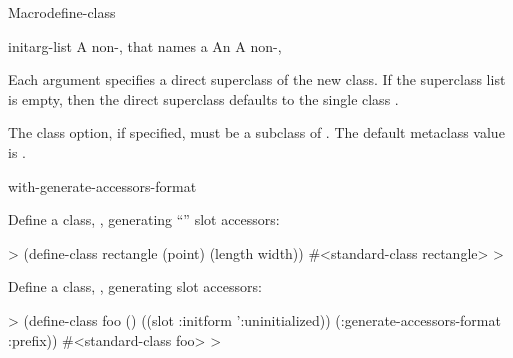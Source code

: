 \documentclass[10pt,twoside,english,pdftex]{article}
\begin{document}
\begin{functiondoc}{Macro}{define-class}
\fnterms
\begin{args}{initarg-list}
 A non-\nil,  that names a
 An 
 A non-\nil, 
\end{args}

\fndescription 
Each  argument specifies a direct superclass of
the new class. If the superclass list is empty, then the direct
superclass defaults to the single class .

%
The  class option, if specified, must be a subclass
of .  The default metaclass value is
.

\begin{alsos}{with-generate-accessors-format}
\end{alsos}

\fnexamples Define a class, , generating ``''
slot accessors:
%
\W\supp
\begin{example}
  > (define-class rectangle (point)
      (length width))
  #<standard-class rectangle>
  >
\end{example}

Define a class, , generating
 slot accessors:
%
\W\supp
\begin{example}
  > (define-class foo ()
      ((slot :initform ':uninitialized))
      (:generate-accessors-format :prefix))
  #<standard-class foo>
  >
\end{example}

\end{functiondoc}

\end{document}
